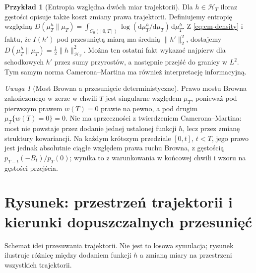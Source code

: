 \documentclass[11pt,a4paper,oneside]{report}
\numberwithin{equation}{chapter}
\theoremstyle{plain}
\theoremstyle{definition}
\newtheorem{przyklad}{Przykład}[chapter]
\theoremstyle{remark}
\newtheorem{uwaga}{Uwaga}[chapter]
\newcommand{\calH}{\mathcal{H}}
\newcommand{\dd}{\mathrm{d}}
\begin{document}
\begin{przyklad}[Entropia względna dwóch miar trajektorii]
Dla $h\in\calH_T$ iloraz gęstości opisuje także koszt
zmiany prawa trajektorii. Definiujemy entropię względną
$D(\mu_T^h\|\mu_T)=\int_{C_0([0,T])}\log(\dd\mu_T^h/\dd\mu_T)
\,\dd\mu_T^h$. Z \eqref{eq:cm-density} i faktu, że
$I(h')$ pod przesuniętą miarą ma średnią $\|h'\|_2^2$,
dostajemy $D(\mu_T^h\|\mu_T)=\frac12\|h\|_{\calH_T}^2$.
Można ten ostatni fakt wykazać najpierw dla schodkowych
$h'$ przez sumy przyrostów, a następnie przejść do granicy
w $L^2$. Tym samym norma Camerona--Martina ma również
interpretację informacyjną.
\end{przyklad}

\begin{uwaga}[Most Browna a przesunięcie deterministyczne]
Prawo mostu Browna zakończonego w zerze w chwili $T$
jest singularne względem $\mu_T$, ponieważ pod pierwszym
prawem $w(T)=0$ prawie na pewno, a pod drugim
$\mu_T\{w(T)=0\}=0$. Nie ma sprzeczności z twierdzeniem
Camerona--Martina: most nie powstaje przez dodanie jednej
ustalonej funkcji $h$, lecz przez zmianę struktury kowariancji.
Na każdym krótszym przedziale $[0,t]$, $t<T$,
jego prawo jest jednak absolutnie ciągłe względem
prawa ruchu Browna, z gęstością
$p_{T-t}(-B_t)/p_T(0)$; wynika to z warunkowania
w końcowej chwili i wzoru na gęstości przejścia.
\end{uwaga}

\section{Rysunek: przestrzeń trajektorii i kierunki dopuszczalnych przesunięć}\label{sec:volIII:09:07}
\begin{center}
\par\smallskip\small Schemat idei przesuwania trajektorii. Nie jest to losowa
symulacja; rysunek ilustruje różnicę między dodaniem funkcji $h$
a zmianą miary na przestrzeni wszystkich trajektorii.
\end{center}
\end{document}
